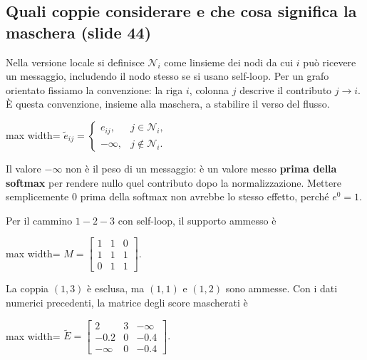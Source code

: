 \documentclass[11pt,a4paper,oneside,openany]{book}
\begin{document}
\subsection{Quali coppie considerare e che cosa significa la maschera (slide 44)}\label{f05-n30-r869}

Nella versione locale si definisce \(\mathcal N_i\) come l\textquotesingle insieme dei nodi da cui \(i\) può ricevere un messaggio, includendo il nodo stesso se si usano self-loop. Per un grafo orientato fissiamo la convenzione: la riga \(i\), colonna \(j\) descrive il contributo \textbf{\(j\to i\)}. È questa convenzione, insieme alla maschera, a stabilire il verso del flusso.

\begin{center}
\begin{adjustbox}{max width=\linewidth}
$\displaystyle \widetilde e_{ij}=\begin{cases}
e_{ij},&j\in\mathcal N_i,\\
-\infty,&j\notin\mathcal N_i.
\end{cases}$
\end{adjustbox}
\end{center}

Il valore \(-\infty\) non è il peso di un messaggio: è un valore messo \textbf{prima della softmax} per rendere nullo quel contributo dopo la normalizzazione. Mettere semplicemente 0 prima della softmax non avrebbe lo stesso effetto, perché \(e^0=1\).

Per il cammino \(1-2-3\) con self-loop, il supporto ammesso è

\begin{center}
\begin{adjustbox}{max width=\linewidth}
$\displaystyle M=\begin{bmatrix}1&1&0\\1&1&1\\0&1&1\end{bmatrix}.$
\end{adjustbox}
\end{center}

La coppia \((1,3)\) è esclusa, ma \((1,1)\) e \((1,2)\) sono ammesse. Con i dati numerici precedenti, la matrice degli score mascherati è

\begin{center}
\begin{adjustbox}{max width=\linewidth}
$\displaystyle \widetilde E=\begin{bmatrix}
2&3&-\infty\\
-0.2&0&-0.4\\
-\infty&0&-0.4
\end{bmatrix}.$
\end{adjustbox}
\end{center}
\end{document}
